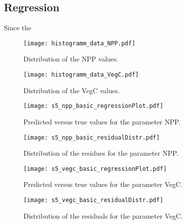 \pagebreak
\subsection{Regression}

Since the 

\begin{figure}[h]
  \centering
  \begin{minipage}{0.45\textwidth}
    \centering
    \texttt{[image: histogramm\_data\_NPP.pdf]}
    \caption{Distribution of the NPP values.}
    \label{pl:s5:npp:basic:regressionPlot}
  \end{minipage}
  \hfill
  \begin{minipage}{0.45\textwidth}
    \centering
    \texttt{[image: histogramm\_data\_VegC.pdf]}
    \caption{Distribution of the VegC values.}
    \label{pl:s5:npp:basic:residualDistr}
  \end{minipage}
\end{figure}

\begin{figure}[h]
  \centering
  \begin{minipage}{0.45\textwidth}
    \centering
    \texttt{[image: s5\_npp\_basic\_regressionPlot.pdf]}
    \caption{Predicted versus true values for the parameter NPP.}
    \label{pl:s5:npp:basic:regressionPlot}
  \end{minipage}
  \hfill
  \begin{minipage}{0.45\textwidth}
    \centering
    \texttt{[image: s5\_npp\_basic\_residualDistr.pdf]}
    \caption{Distribution of the residues for the parameter NPP.}
    \label{pl:s5:npp:basic:residualDistr}
  \end{minipage}
\end{figure}



\begin{figure}[h]
  \centering
  \begin{minipage}{0.45\textwidth}
    \centering
    \texttt{[image: s5\_vegc\_basic\_regressionPlot.pdf]}
    \caption{Predicted versus true values for the parameter VegC.}
    \label{pl:s5:npp:basic:regressionPlot}
  \end{minipage}
  \hfill 
  \begin{minipage}{0.45\textwidth}
    \centering
    \texttt{[image: s5\_vegc\_basic\_residualDistr.pdf]}
    \caption{Distribution of the residuals for the parameter VegC.}
    \label{pl:s5:npp:basic:residualDistr}
  \end{minipage}
\end{figure}


